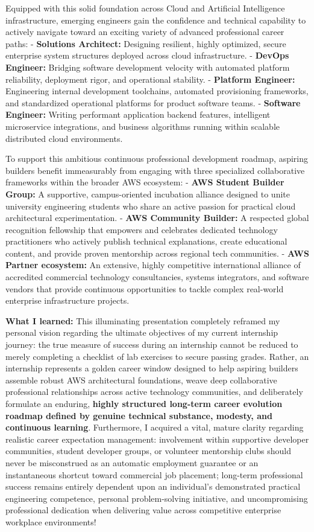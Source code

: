 Equipped with this solid foundation across Cloud and Artificial
Intelligence infrastructure, emerging engineers gain the confidence and
technical capability to actively navigate toward an exciting variety of
advanced professional career paths: - \textbf{Solutions Architect:}
Designing resilient, highly optimized, secure enterprise system
structures deployed across cloud infrastructure. - \textbf{DevOps
Engineer:} Bridging software development velocity with automated
platform reliability, deployment rigor, and operational stability. -
\textbf{Platform Engineer:} Engineering internal development toolchains,
automated provisioning frameworks, and standardized operational
platforms for product software teams. - \textbf{Software Engineer:}
Writing performant application backend features, intelligent
microservice integrations, and business algorithms running within
scalable distributed cloud environments.

To support this ambitious continuous professional development roadmap,
aspiring builders benefit immeasurably from engaging with three
specialized collaborative frameworks within the broader AWS ecosystem: -
\textbf{AWS Student Builder Group:} A supportive, campus-oriented
incubation alliance designed to unite university engineering students
who share an active passion for practical cloud architectural
experimentation. - \textbf{AWS Community Builder:} A respected global
recognition fellowship that empowers and celebrates dedicated technology
practitioners who actively publish technical explanations, create
educational content, and provide proven mentorship across regional tech
communities. - \textbf{AWS Partner ecosystem:} An extensive, highly
competitive international alliance of accredited commercial technology
consultancies, systems integrators, and software vendors that provide
continuous opportunities to tackle complex real-world enterprise
infrastructure projects.

\textbf{What I learned:} This illuminating presentation completely
reframed my personal vision regarding the ultimate objectives of my
current internship journey: the true measure of success during an
internship cannot be reduced to merely completing a checklist of lab
exercises to secure passing grades. Rather, an internship represents a
golden career window designed to help aspiring builders assemble robust
AWS architectural foundations, weave deep collaborative professional
relationships across active technology communities, and deliberately
formulate an enduring, \textbf{highly structured long-term career
evolution roadmap defined by genuine technical substance, modesty, and
continuous learning}. Furthermore, I acquired a vital, mature clarity
regarding realistic career expectation management: involvement within
supportive developer communities, student developer groups, or volunteer
mentorship clubs should never be misconstrued as an automatic employment
guarantee or an instantaneous shortcut toward commercial job placement;
long-term professional success remains entirely dependent upon an
individual's demonstrated practical engineering competence, personal
problem-solving initiative, and uncompromising professional dedication
when delivering value across competitive enterprise workplace
environments!

